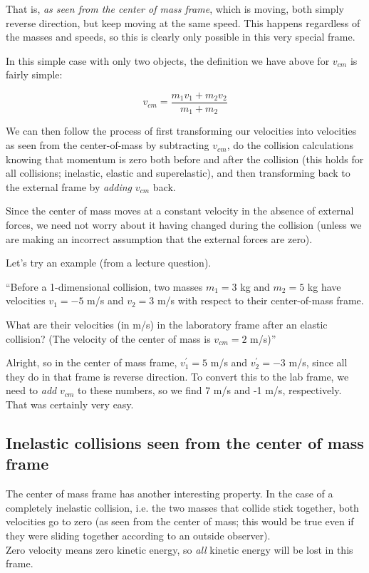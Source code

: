 \documentclass[12pt,a4paper]{report}
\begin{document}
That is, \emph{as seen from the center of mass frame}, which is moving, both simply reverse direction, but keep moving at the same speed. This happens regardless of the masses and speeds, so this is clearly only possible in this very special frame.

In this simple case with only two objects, the definition we have above for $v_{cm}$ is fairly simple:

\begin{equation}
v_{cm} = \frac{m_1 v_1 + m_2 v_2}{m_1 + m_2}
\end{equation}

We can then follow the process of first transforming our velocities into velocities as seen from the center-of-mass by subtracting $v_{cm}$, do the collision calculations knowing that momentum is zero both before and after the collision (this holds for all collisions; inelastic, elastic and superelastic), and then transforming back to the external frame by \emph{adding} $v_{cm}$ back.

Since the center of mass moves at a constant velocity in the absence of external forces, we need not worry about it having changed during the collision (unless we are making an incorrect assumption that the external forces are zero).

Let's try an example (from a lecture question).

``Before a 1-dimensional collision, two masses $m_1 = 3$ kg and $m_2 = 5$ kg have velocities $v_1 = -5$ m/s and $v_2 = 3$ m/s with respect to their center-of-mass frame.

What are their velocities (in m/s) in the laboratory frame after an elastic collision? (The velocity of the center of mass is $v_{cm} = 2$ m/s)''

Alright, so in the center of mass frame, $v_1^{'} = 5$ m/s and $v_2^{'} = -3$ m/s, since all they do in that frame is reverse direction. To convert this to the lab frame, we need to \emph{add} $v_{cm}$ to these numbers, so we find 7 m/s and -1 m/s, respectively. That was certainly very easy.

\subsection{Inelastic collisions seen from the center of mass frame}

The center of mass frame has another interesting property. In the case of a completely inelastic collision, i.e. the two masses that collide stick together, both velocities go to zero (as seen from the center of mass; this would be true even if they were sliding together according to an outside observer).\\
Zero velocity means zero kinetic energy, so \emph{all} kinetic energy will be lost in this frame.
\end{document}
